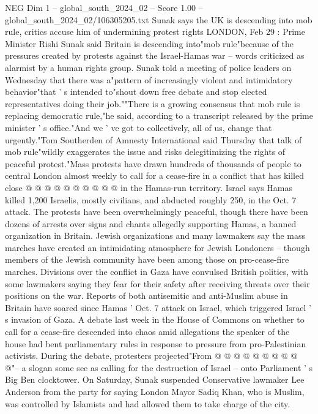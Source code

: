 \begin{textsample}{NEG Dim 1 – global\_south\_2024\_02 – Score 1.00 – global\_south\_2024\_02/106305205.txt}  \label{ex:f1_neg_249}
Sunak says the UK is descending into mob rule, critics accuse him of undermining protest rights LONDON, Feb 29 : Prime Minister Rishi Sunak said Britain is descending into"mob rule"because of the pressures created by protests against the Israel-Hamas war -- words criticized as alarmist by a human rights group.
Sunak told a meeting of police leaders on Wednesday that there was a"pattern of increasingly violent and intimidatory behavior"that ' s intended to"shout down free debate and stop elected representatives doing their job.""There is a growing consensus that mob rule is replacing democratic rule,"he said, according to a transcript released by the prime minister ' s office."And we ' ve got to collectively, all of us, change that urgently."Tom Southerden of Amnesty International said Thursday that talk of mob rule"wildly exaggerates the issue and risks delegitimizing the rights of peaceful protest."Mass protests have drawn hundreds of thousands of people to central London almost weekly to call for a cease-fire in a conflict that has killed close @ @ @ @ @ @ @ @ @ @ in the Hamas-run territory.
Israel says Hamas killed 1,200 Israelis, mostly civilians, and abducted roughly 250, in the Oct. 7 attack.
The protests have been overwhelmingly peaceful, though there have been dozens of arrests over signs and chants allegedly supporting Hamas, a banned organization in Britain.
Jewish organizations and many lawmakers say the mass marches have created an intimidating atmosphere for Jewish Londoners -- though members of the Jewish community have been among those on pro-cease-fire marches.
Divisions over the conflict in Gaza have convulsed British politics, with some lawmakers saying they fear for their safety after receiving threats over their positions on the war.
Reports of both antisemitic and anti-Muslim abuse in Britain have soared since Hamas ' Oct. 7 attack on Israel, which triggered Israel ' s invasion of Gaza.
A debate last week in the House of Commons on whether to call for a cease-fire descended into chaos amid allegations the speaker of the house had bent parliamentary rules in response to pressure from pro-Palestinian activists.
During the debate, protesters projected"From @ @ @ @ @ @ @ @ @ @"-- a slogan some see as calling for the destruction of Israel -- onto Parliament ' s Big Ben clocktower.
On Saturday, Sunak suspended Conservative lawmaker Lee Anderson from the party for saying London Mayor Sadiq Khan, who is Muslim, was controlled by Islamists and had allowed them to take charge of the city.

\end{textsample}

